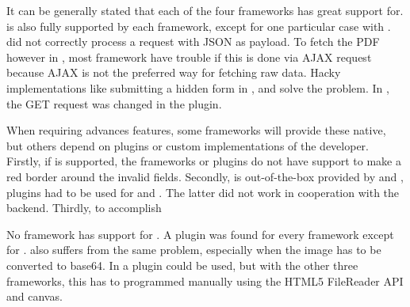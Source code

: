 \documentclass[a4paper]{artikel3}
\newcommand{\setspace}[0]{\vspace{2mm}}
\renewcommand{\paragraph}[1]{\setspace \noindent {\bf #1}  }
\newcommand{\challenge}[1]{\paragraph{#1}}
\begin{document}
It can be generally stated that each of the four frameworks has great support for.
 is also fully supported by each framework, except for one particular case with \lungo{}.
\quo{} did not correctly process a request with JSON as payload.
To fetch the PDF however in , most framework have trouble if this is done via AJAX request because AJAX is not the preferred way for fetching raw data.
Hacky implementations like submitting a hidden form in \jqma{}, \kendob{} and \lungo{} solve the problem.
In \sta{}, the GET request was changed in the plugin.

When requiring advances features, some frameworks will provide these native, but others depend on plugins or custom implementations of the developer.
Firstly, if  is supported, the frameworks or plugins do not have support to make a red border around the invalid fields.
Secondly,  is out-of-the-box provided by \kendob{} and \jqma{}, plugins had to be used for \lungo{} and \sta{}.
The latter did not work in cooperation with the backend.
Thirdly, to accomplish  %

No framework has support for .
A plugin was found for every framework except for \lungo{}.
 also suffers from the same problem, especially when the image has to be converted to base64.
In \st{} a plugin could be used, but with the other three frameworks, this has to programmed manually using the HTML5 FileReader API and canvas. 


\end{document}

